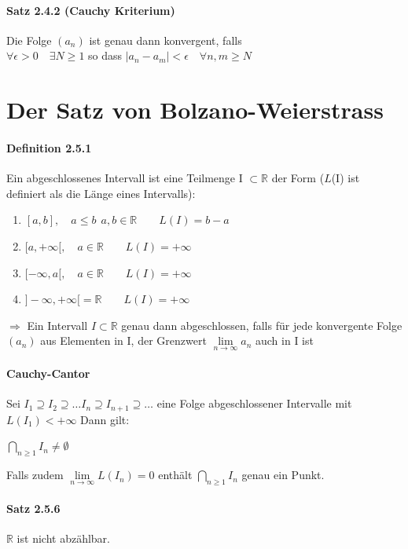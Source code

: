 \documentclass[8pt]{extreport}
\begin{document}
\paragraph{Satz 2.4.2 (Cauchy Kriterium)} Die Folge $(a_{n})$ ist genau dann konvergent, falls\\
$\forall \epsilon > 0 \quad \exists N \geq 1$ so dass $|a_{n} - a_{m}| < \epsilon \quad \forall n,m \geq N$
\section{Der Satz von Bolzano-Weierstrass}
\paragraph{Definition 2.5.1} Ein abgeschlossenes Intervall ist eine Teilmenge I $\subset \mathbb{R}$ der Form ($\mathit{L}$(I) ist definiert als die Länge eines Intervalls):
\begin{enumerate}
\item $[a,b], \quad a\leq b \ \ a,b \in \mathbb{R} \qquad \mathit{L}(I) = b-a$
\item $[a,+\infty[, \quad a \in \mathbb{R}  \qquad \mathit{L}(I) = + \infty$
\item $[-\infty,a[, \quad a \in \mathbb{R}  \qquad \mathit{L}(I) = + \infty$
\item $]-\infty,+\infty[ = \mathbb{R} \qquad \mathit{L}(I) = +\infty$
\end{enumerate}
$ \Rightarrow$ Ein Intervall $I \subset \mathbb{R}$ genau dann abgeschlossen, falls für jede konvergente Folge $(a_{n})$ aus Elementen in I, der Grenzwert $\lim\limits_{n\to \infty}a_{n}$ auch in I ist
\paragraph{Cauchy-Cantor} Sei $I_{1} \supseteq I_{2} \supseteq \dots I_{n} \supseteq I_{n+1} \supseteq \dots$ eine Folge abgeschlossener Intervalle mit $\mathit{L}(I_{1}) < +\infty$ Dann gilt:\\
\begin{center}
$\bigcap\limits_{n\geq 1} I_{n} \neq \emptyset$
\end{center}
Falls zudem $\lim\limits_{n\to \infty} \mathit{L}(I_{n}) = 0$ enthält $\bigcap\limits_{n\geq 1} I_{n}$ genau ein Punkt.
\paragraph{Satz 2.5.6} $\mathbb{R}$ ist nicht abzählbar.
\end{document}
